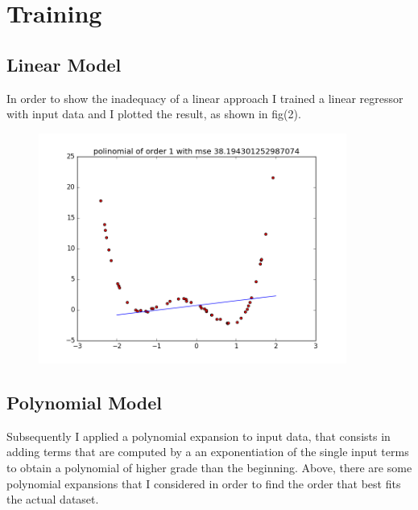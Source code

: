 \documentclass{article}
\begin{document}
	
	

				\section{Training}
				
				
				\subsection{Linear Model}
				In order to show the inadequacy of a linear approach I trained a linear regressor with input data and I plotted the result,  as shown in fig(2).
				\begin{center}
\begin{figure}
\centering
\includegraphics[width=0.9\textwidth]{poli-order-1}
\caption{}
\label{fig:2}
\end{figure}
\end{center}
				\subsection{Polynomial Model}
				Subsequently I applied a polynomial expansion to input data, that consists in adding terms that are computed by a an exponentiation of the single input terms to obtain a polynomial of higher grade than the beginning.
				Above, there are some polynomial expansions that I considered in order to find the order that best fits the actual dataset.
				
\end{document}
